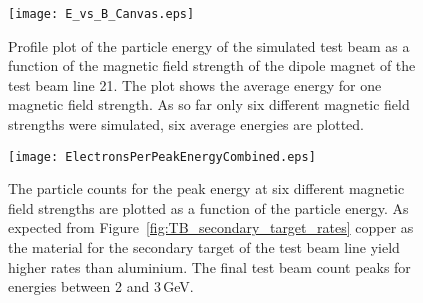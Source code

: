 \begin{figure}[!ht]
  \centering
  \texttt{[image: E\_vs\_B\_Canvas.eps]}
  \caption[Plot of the simulated particle energy in dependency of the magnetic field strength.]{Profile plot of the particle energy of the simulated test beam as a function of the magnetic field strength of the dipole magnet of the test beam line 21. The plot shows the average energy for one magnetic field strength. As so far only six different magnetic field strengths were simulated, six average energies are plotted.}
    \label{fig:E_over_B}
\end{figure}

\begin{figure}[!ht]
  \centering
  \texttt{[image: ElectronsPerPeakEnergyCombined.eps]}
  \caption[Plot of the simulated particle count in dependency of the particle energy.]{The particle counts for the peak energy at six different magnetic field strengths are plotted as a function of the particle energy. As expected from Figure~\ref{fig:TB_secondary_target_rates} copper as the material for the secondary target of the test beam line yield higher rates than aluminium. The final test beam count peaks for energies between 2 and 3\,GeV.}
    \label{fig:N_over_E}
\end{figure}